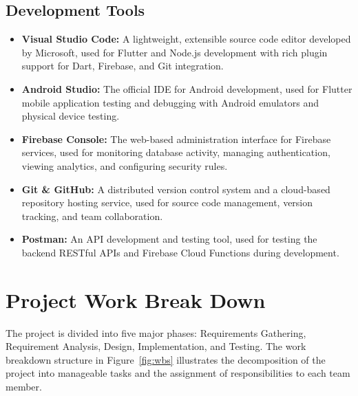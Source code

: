 \documentclass[12pt,a4paper]{report}
\begin{document}
\subsection{Development Tools}
\begin{itemize}
    \item \textbf{Visual Studio Code:} A lightweight, extensible source code
    editor developed by Microsoft, used for Flutter and Node.js development with
    rich plugin support for Dart, Firebase, and Git integration.
    \item \textbf{Android Studio:} The official IDE for Android development,
    used for Flutter mobile application testing and debugging with Android
    emulators and physical device testing.
    \item \textbf{Firebase Console:} The web-based administration interface for
    Firebase services, used for monitoring database activity, managing
    authentication, viewing analytics, and configuring security rules.
    \item \textbf{Git \& GitHub:} A distributed version control system and a
    cloud-based repository hosting service, used for source code management,
    version tracking, and team collaboration.
    \item \textbf{Postman:} An API development and testing tool, used for
    testing the backend RESTful APIs and Firebase Cloud Functions during
    development.
\end{itemize}

\section{Project Work Break Down}

The project is divided into five major phases: Requirements Gathering,
Requirement Analysis, Design, Implementation, and Testing. The work breakdown
structure in Figure~\ref{fig:wbs} illustrates the decomposition of the project
into manageable tasks and the assignment of responsibilities to each team member.
\end{document}
